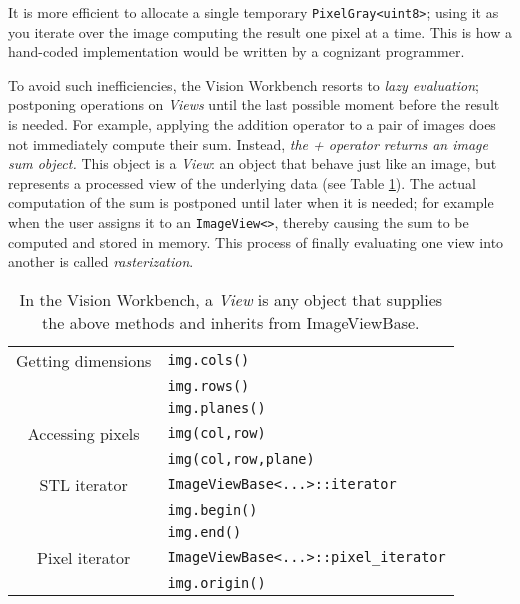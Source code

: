It is more efficient to allocate a single temporary
\verb#PixelGray<uint8>#; using it as you iterate over the image
computing the result one pixel at a time.  This is how a hand-coded
implementation would be written by a cognizant programmer.

To avoid such inefficiencies, the Vision Workbench resorts to {\em
  lazy evaluation}; postponing operations on {\em Views} until the
last possible moment before the result is needed.  For example,
applying the addition operator to a pair of images does not
immediately compute their sum.  Instead, {\em the + operator returns
  an image sum object.}  This object is a {\em View}: an object that
behave just like an image, but represents a processed view of the
underlying data (see Table \ref{tbl:view-concept}).  The actual
computation of the sum is postponed until later when it is needed; for
example when the user assigns it to an \verb#ImageView<>#, thereby
causing the sum to be computed and stored in memory.  This process of
finally evaluating one view into another is called {\em
  rasterization}.
  \begin{table}[tb]\begin{centering}
 \begin{tabular}{|c|l|} \hline
   Getting dimensions &   \verb#img.cols()#   \\
                      &   \verb#img.rows()#   \\
                      &   \verb#img.planes()# \\
   \hline
   Accessing pixels  & \verb#img(col,row)# \\
                     & \verb#img(col,row,plane)# \\
   \hline
   STL iterator      & \verb#ImageViewBase<...>::iterator# \\
                     & \verb#img.begin()# \\
                     & \verb#img.end()#\\
   \hline
   Pixel iterator   & \verb#ImageViewBase<...>::pixel_iterator# \\
                    & \verb#img.origin()# \\
   \hline
 \end{tabular}
 \caption{In the Vision Workbench, a {\em View} is any object that supplies the above methods and inherits from ImageViewBase.}
 \label{tbl:view-concept}
 \end{centering}\end{table}

